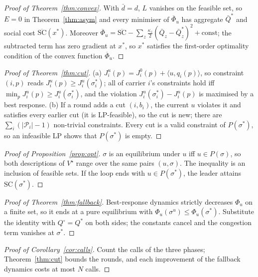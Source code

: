 \documentclass[preprint,12pt]{elsarticle}
\theoremstyle{definition}
\theoremstyle{remark}
\newcommand{\ip}[2]{\langle #1,#2\rangle}
\begin{document}
\begin{proof}[Proof of Theorem~\ref{thm:convex}]
With $\bar d=d$, $L$ vanishes on the feasible set, so $E=0$ in Theorem~\ref{thm:asym} and every minimiser of $\overline\Phi_u$ has aggregate $\bar Q^*$ and social cost $\overline{\mathrm{SC}}(x^*)$. Moreover $\overline\Phi_u=\overline{\mathrm{SC}}-\sum_z\tfrac{\kappa_z}{2}(\bar Q_z-\bar Q^*_z)^2+\text{const}$; the subtracted term has zero gradient at $x^*$, so $x^*$ satisfies the first-order optimality condition of the convex function $\overline\Phi_u$.
\end{proof}

\begin{proof}[Proof of Theorem~\ref{thm:cut}]
(a) $J^u_i(p)=J^0_i(p)+\ip{u}{q_i(p)}$, so constraint $(i,p)$ reads $J^u_i(p)\ge J^u_i(\sigma^*_i)$; all of carrier $i$'s constraints hold iff $\min_pJ^u_i(p)\ge J^u_i(\sigma^*_i)$, and the violation $J^u_i(\sigma^*_i)-J^u_i(p)$ is maximised by a best response. (b) If a round adds a cut $(i,b_i)$, the current $u$ violates it and satisfies every earlier cut (it is LP-feasible), so the cut is new; there are $\sum_i(|\mathcal P_i|-1)$ non-trivial constraints. Every cut is a valid constraint of $P(\sigma^*)$, so an infeasible LP shows that $P(\sigma^*)$ is empty.
\end{proof}

\begin{proof}[Proof of Proposition~\ref{prop:opt}]
$\sigma$ is an equilibrium under $u$ iff $u\in P(\sigma)$, so both descriptions of $V^\star$ range over the same pairs $(u,\sigma)$. The inequality is an inclusion of feasible sets. If the loop ends with $u\in P(\sigma^*)$, the leader attains $\mathrm{SC}(\sigma^*)$.
\end{proof}

\begin{proof}[Proof of Theorem~\ref{thm:fallback}]
Best-response dynamics strictly decreases $\Phi_u$ on a finite set, so it ends at a pure equilibrium with $\Phi_u(\sigma^u)\le\Phi_u(\sigma^*)$. Substitute the identity with $Q^\circ=Q^*$ on both sides; the constants cancel and the congestion term vanishes at $\sigma^*$.
\end{proof}

\begin{proof}[Proof of Corollary~\ref{cor:calls}]
Count the calls of the three phases; Theorem~\ref{thm:cut} bounds the rounds, and each improvement of the fallback dynamics costs at most $N$ calls.
\end{proof}
\end{document}
